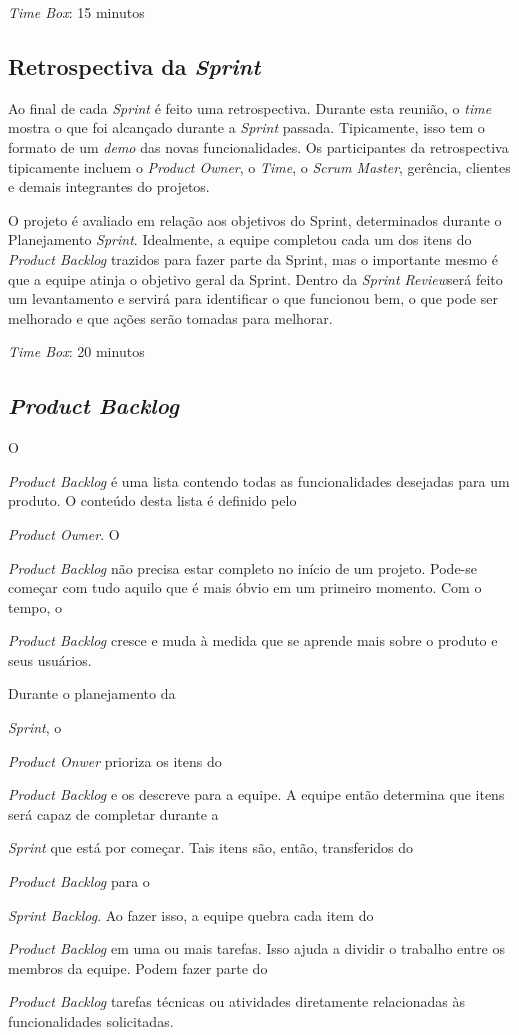 {{{{{{{{{{{\emph{Time Box}: 15 minutos

\subsection{Retrospectiva da \emph{Sprint}}

Ao final de cada \emph{Sprint} é feito uma retrospectiva. Durante esta reunião, o \emph{time} mostra o que foi alcançado durante a \emph{Sprint} passada. 
Tipicamente, isso tem o formato de um \emph{demo} das novas funcionalidades. Os participantes da retrospectiva tipicamente incluem o \emph{Product Owner}, 
o \emph{Time}, o \emph{Scrum Master}, gerência, clientes e demais integrantes do projetos.

O projeto é avaliado em relação aos objetivos do Sprint, determinados durante o Planejamento \emph{Sprint}. Idealmente, a equipe completou cada um dos itens do 
\emph{Product Backlog} trazidos para fazer parte da Sprint, mas o importante mesmo é que a equipe atinja o objetivo geral da Sprint.
Dentro da \emph{Sprint Review}será feito um levantamento e servirá para identificar o que funcionou bem, o que pode ser melhorado e que ações serão tomadas para melhorar.

\emph{Time Box}: 20 minutos    

\subsection{\emph{Product Backlog}}

O {\emph{Product Backlog} é uma lista contendo todas as funcionalidades desejadas para um produto. O conteúdo desta lista é definido pelo {\emph{Product Owner}. 
O {\emph{Product Backlog} não precisa estar completo no início de um projeto. Pode-se começar com tudo aquilo que é mais óbvio em um primeiro momento. 
Com o tempo, o {\emph{Product Backlog} cresce e muda à medida que se aprende mais sobre o produto e seus usuários.

Durante o planejamento da {\emph{Sprint}, o {\emph{Product Onwer} prioriza os itens do {\emph{Product Backlog} e os descreve para a equipe. A equipe então determina que itens será 
capaz de completar durante a {\emph{Sprint} que está por começar. Tais itens são, então, transferidos do {\emph{Product Backlog} para o {\emph{Sprint Backlog}. 
Ao fazer isso, a equipe quebra cada item do {\emph{Product Backlog} em uma ou mais tarefas. Isso ajuda a dividir o trabalho entre os membros 
da equipe. Podem fazer parte do {\emph{Product Backlog} tarefas técnicas ou atividades diretamente relacionadas às funcionalidades solicitadas.


}}}}}}}}}}}}}}}}}}}}}}}
